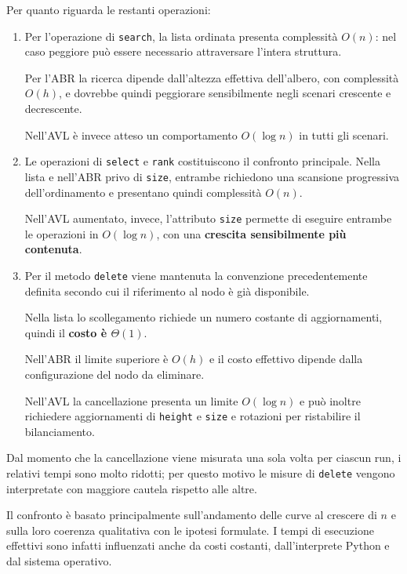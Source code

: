 \documentclass[a4paper,11pt]{article}
\begin{document}
Per quanto riguarda le restanti operazioni:
\begin{enumerate}

    \item Per l'operazione di \texttt{search}, la lista ordinata
    presenta complessità $O(n)$: nel caso peggiore può essere
    necessario attraversare l'intera struttura.

    Per l'ABR la ricerca dipende dall'altezza effettiva dell'albero,
    con complessità $O(h)$, e dovrebbe quindi peggiorare
    sensibilmente negli scenari crescente e decrescente.

    Nell'AVL è invece atteso un comportamento $O(\log n)$
    in tutti gli scenari.


    \item Le operazioni di \texttt{select} e \texttt{rank}
    costituiscono il confronto principale. Nella lista e nell'ABR
    privo di \texttt{size}, entrambe richiedono una scansione
    progressiva dell'ordinamento e presentano quindi complessità
    $O(n)$.

    Nell'AVL aumentato, invece, l'attributo \texttt{size} permette
    di eseguire entrambe le operazioni in $O(\log n)$, con una
    \textbf{crescita sensibilmente più contenuta}.


    \item Per il metodo \texttt{delete} viene mantenuta la convenzione
    precedentemente definita secondo cui il riferimento al nodo è già
    disponibile.

    Nella lista lo scollegamento richiede un numero costante di
    aggiornamenti, quindi il \textbf{costo è $\Theta(1)$}.

    Nell'ABR il limite superiore è $O(h)$ e il costo effettivo dipende
    dalla configurazione del nodo da eliminare.

    Nell'AVL la cancellazione presenta un limite $O(\log n)$ e può
    inoltre richiedere aggiornamenti di \texttt{height} e
    \texttt{size} e rotazioni per ristabilire il bilanciamento.
\end{enumerate}

Dal momento che la cancellazione viene misurata una sola volta per
ciascun run, i relativi tempi sono molto ridotti; per questo motivo le
misure di \texttt{delete} vengono interpretate con maggiore cautela
rispetto alle altre.

Il confronto è basato principalmente sull'andamento delle curve al
crescere di $n$ e sulla loro coerenza qualitativa con le ipotesi
formulate. I tempi di esecuzione effettivi sono infatti influenzati
anche da costi costanti, dall'interprete Python e dal sistema operativo.
\end{document}
